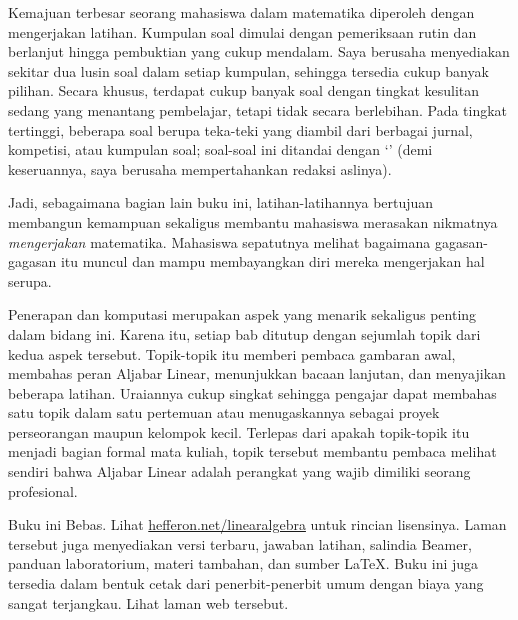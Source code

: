 {Kemajuan terbesar seorang mahasiswa dalam matematika diperoleh dengan mengerjakan latihan.
Kumpulan soal dimulai dengan
pemeriksaan rutin dan berlanjut hingga pembuktian yang cukup mendalam.
Saya berusaha menyediakan sekitar dua lusin soal dalam setiap kumpulan,
sehingga tersedia cukup banyak pilihan.
Secara khusus, terdapat cukup banyak soal dengan tingkat kesulitan sedang
yang menantang pembelajar, tetapi tidak secara berlebihan.
Pada tingkat tertinggi, beberapa soal berupa teka-teki
yang diambil dari berbagai jurnal, kompetisi, atau
kumpulan soal; soal-soal ini
ditandai dengan
`\puzzlemark'
(demi keseruannya, saya berusaha mempertahankan redaksi aslinya).

Jadi, sebagaimana bagian lain buku ini,
latihan-latihannya bertujuan membangun kemampuan sekaligus
membantu mahasiswa merasakan nikmatnya
\emph{mengerjakan} matematika.
Mahasiswa sepatutnya melihat bagaimana gagasan-gagasan itu muncul dan mampu
membayangkan diri mereka mengerjakan hal serupa.


\medskip
{}
Penerapan dan komputasi merupakan aspek yang menarik sekaligus penting
dalam bidang ini.
Karena itu, setiap bab ditutup dengan sejumlah
topik dari kedua aspek tersebut.
Topik-topik itu memberi pembaca
gambaran awal, membahas peran Aljabar Linear,
menunjukkan bacaan lanjutan, dan menyajikan beberapa latihan.
Uraiannya cukup singkat sehingga pengajar dapat membahas satu topik
dalam satu pertemuan
atau menugaskannya sebagai proyek perseorangan maupun kelompok kecil.
Terlepas dari apakah topik-topik itu menjadi bagian formal mata kuliah,
topik tersebut membantu pembaca melihat sendiri bahwa Aljabar Linear adalah
perangkat yang wajib dimiliki seorang profesional.




\medskip
{}
Buku ini Bebas.
Lihat \url{hefferon.net/linearalgebra}
untuk rincian lisensinya.
Laman tersebut juga menyediakan versi terbaru,
jawaban latihan, salindia Beamer, panduan laboratorium, materi tambahan,
dan sumber \LaTeX.
Buku ini juga tersedia dalam bentuk cetak
dari penerbit-penerbit umum dengan biaya yang sangat terjangkau.
Lihat laman web tersebut.



}

